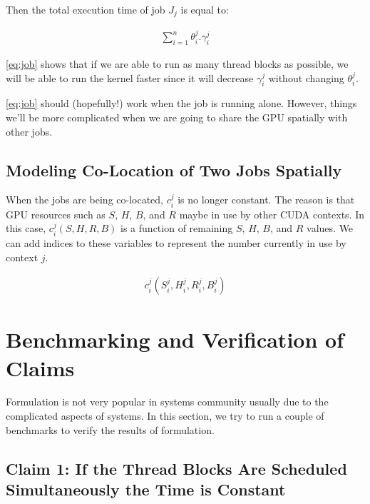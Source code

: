 \documentclass[11pt]{article}
\begin{document}
Then the total execution time of job $J_j$ is equal to:

\begin{align}
    \sum_{i=1}^n \theta^j_i.\gamma^j_i
    \label{eq:job}
\end{align}

\cref{eq:job} shows that if we are able to run as many thread blocks as
possible, we will be able to run the kernel faster since it will decrease
$\gamma^j_i$ without changing $\theta^j_i$.

\cref{eq:job} should (hopefully!) work when the job is running alone. However,
things we'll be more complicated when we are going to share the GPU spatially
with other jobs.

\subsection{Modeling Co-Location of Two Jobs Spatially}

When the jobs are being co-located, $c^j_i$ is no longer constant. The reason is
that GPU resources such as $S$, $H$, $B$, and $R$ maybe in use by other CUDA
contexts. In this case, $c^j_i(S, H, R, B)$ is a function of remaining $S$, $H$,
$B$, and $R$ values. We can add indices to these variables to represent the
number currently in use by context $j$.

\begin{align}
    c^j_i(S^j_i, H^j_i, R^j_i, B^j_i)
\end{align}


\section{Benchmarking and Verification of Claims}

Formulation is not very popular in systems community usually due to the
complicated aspects of systems. In this section, we try to run a couple of
benchmarks to verify the results of formulation.

\subsection{Claim 1: If the Thread Blocks Are Scheduled Simultaneously the Time
is Constant}


\printbibliography
\end{document}
